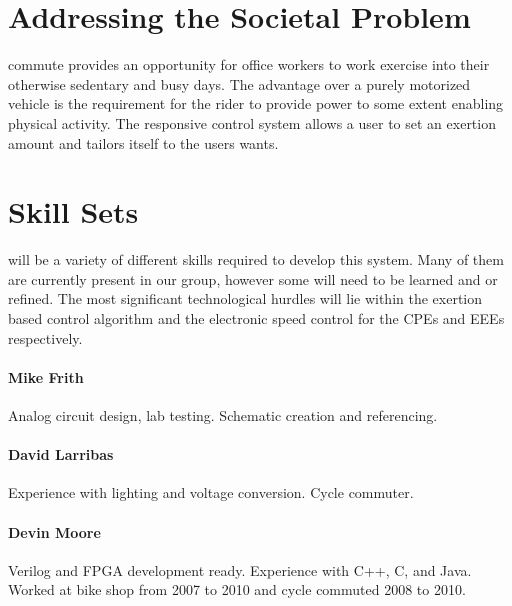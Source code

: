 \documentclass[12pt,article]{IEEEtran}
\begin{document}

     
\section{Addressing the Societal Problem}
    
     commute provides an opportunity for office workers to work exercise into 
        their otherwise sedentary and busy days.  The advantage over a purely motorized vehicle is the
        requirement for the rider to provide power to some extent enabling physical activity. The 
        responsive control system allows a user to set an exertion amount and tailors itself to the 
        users wants.

\section{\bfseries Skill Sets}
     will be a variety of different skills required to develop this system.
        Many of them are currently present in our group, however some will need to be learned and or
        refined. The most significant technological hurdles will lie within the exertion based control
        algorithm and the electronic speed control for the CPEs and EEEs respectively.

    \paragraph{\bfseries Mike Frith}
        Analog circuit design, lab testing. Schematic creation and referencing.

    \paragraph{\bfseries David Larribas}
        Experience with lighting and voltage conversion. Cycle commuter.

    \paragraph{\bfseries Devin Moore}
        Verilog and FPGA development ready. Experience with C++, C, and Java. Worked at bike 
        shop from 2007 to 2010 and cycle commuted 2008 to 2010.
    
\end{document}
